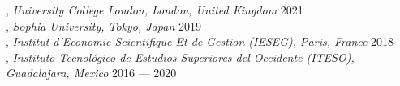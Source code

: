 
, \textit{University College London, London, United Kingdom}	\hfill 2021 
\vspace{5mm} \\

, \textit{Sophia University, Tokyo, Japan}	\hfill 2019
\vspace{5mm} \\

, \textit{Institut d'Economie Scientifique Et de Gestion (IESEG), Paris, France} \hfill	2018
\vspace{5mm} \\

, \textit{Instituto Tecnológico de Estudios Superiores del Occidente (ITESO), \\ Guadalajara, Mexico} \hfill 2016 --- 2020